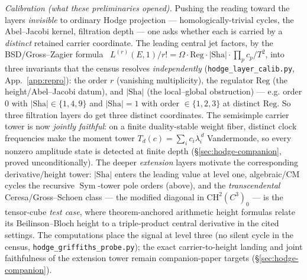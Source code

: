 \documentclass[11pt]{article}
\theoremstyle{definition}
\newcommand{\Sym}{\operatorname{Sym}}
\newcommand{\Sha}{\mathrm{Sha}}
\begin{document}
\emph{Calibration (what these preliminaries opened).} Pushing the reading toward the layers
\emph{invisible} to ordinary Hodge projection --- homologically-trivial cycles, the Abel--Jacobi kernel,
filtration depth --- one asks whether each is carried by a \emph{distinct} retained carrier coordinate.
The leading central jet factors, by the BSD/Gross--Zagier formula~\cite{BSD,GrossZagier}
$L^{(r)}(E,1)/r!=\Omega\cdot\mathrm{Reg}\cdot|\Sha|\cdot\prod_p c_p/T^2$, into three invariants that the
census resolves \emph{independently} (\texttt{hodge\_layer\_calib.py}, App.~\ref{app:repro}): the order
$r$ (vanishing multiplicity), the regulator $\mathrm{Reg}$ (the height/Abel--Jacobi datum),
and $|\Sha|$ (the local--global obstruction) --- e.g. order $0$ with $|\Sha|\in\{1,4,9\}$ and
$|\Sha|=1$ with order $\in\{1,2,3\}$ at distinct $\mathrm{Reg}$. So three filtration layers do get three
distinct coordinates. The semisimple carrier tower is now \emph{jointly faithful}: on a finite
duality-stable weight fiber, distinct clock frequencies make the moment tower
$T_d(c)=\sum_i c_i\lambda_i^{\,d}$ Vandermonde, so every nonzero amplitude state is detected at finite
depth (\S\ref{sec:hodge-companion}, proved unconditionally). The deeper \emph{extension} layers motivate the
corresponding derivative/height tower: $|\Sha|$ enters the leading value at level one, algebraic/CM cycles
the recursive $\Sym$-tower pole orders (above), and the \emph{transcendental} Ceresa/Gross--Schoen class
--- the modified diagonal in $\mathrm{CH}^2(C^3)_0$ --- is the tensor-cube \emph{test case}, where
theorem-anchored arithmetic height formulas relate its Beilinson--Bloch height to a triple-product central
derivative in the cited settings. The computations place the signal at level three (no silent cycle in the
census, \texttt{hodge\_griffiths\_probe.py}); the exact carrier-to-height landing and joint faithfulness of
the extension tower remain companion-paper targets (\S\ref{sec:hodge-companion}).
\end{document}
